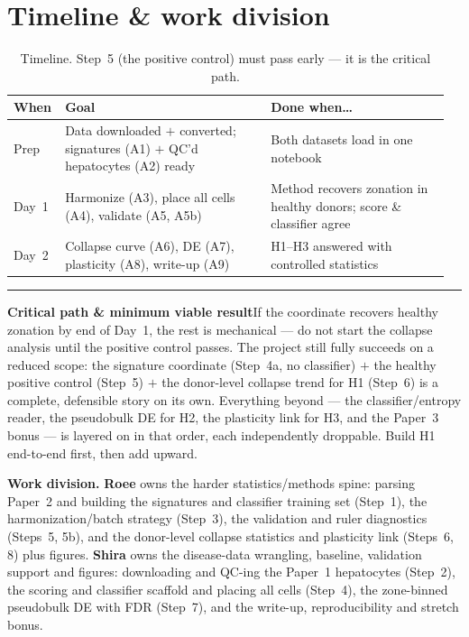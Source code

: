 \documentclass[11pt]{article}
\newcommand{\aside}[2]{\par\medskip\noindent\textcolor{teal0}{\rule{2pt}{\baselineskip}}\quad\textbf{\textcolor{teal0}{#1}}\quad #2\par\medskip}
\begin{document}
\clearpage
\section{Timeline \& work division}
\label{sec:timeline}

\begin{table}[h]
\centering\small
\caption{Timeline. Step~5 (the positive control) must pass early --- it is the critical path.}
\label{tab:timeline}
\begin{tabular}{@{}p{0.10\linewidth} p{0.46\linewidth} p{0.40\linewidth}@{}}
\toprule
\textbf{When} & \textbf{Goal} & \textbf{Done when\ldots}\\
\midrule
Prep & Data downloaded $+$ converted; signatures (A1) $+$ QC'd hepatocytes (A2) ready & Both datasets
load in one notebook\\
Day~1 & Harmonize (A3), place all cells (A4), validate (A5, A5b) & Method recovers zonation in healthy
donors; score \& classifier agree\\
Day~2 & Collapse curve (A6), DE (A7), plasticity (A8), write-up (A9) & H1--H3 answered with controlled
statistics\\
\bottomrule
\end{tabular}
\end{table}

\aside{Critical path \& minimum viable result}{If the coordinate recovers healthy zonation by end of
Day~1, the rest is mechanical --- do not start the collapse analysis until the positive control passes.
The project still fully succeeds on a reduced scope: the signature coordinate (Step~4a, no classifier)
$+$ the healthy positive control (Step~5) $+$ the donor-level collapse trend for H1 (Step~6) is a
complete, defensible story on its own. Everything beyond --- the classifier/entropy reader, the
pseudobulk DE for H2, the plasticity link for H3, and the Paper~3 bonus --- is layered on in that order,
each independently droppable. Build H1 end-to-end first, then add upward.}

\textbf{Work division.} \textbf{Roee} owns the harder statistics/methods spine: parsing Paper~2 and
building the signatures and classifier training set (Step~1), the harmonization/batch strategy (Step~3),
the validation and ruler diagnostics (Steps~5, 5b), and the donor-level collapse statistics and
plasticity link (Steps~6, 8) plus figures. \textbf{Shira} owns the disease-data wrangling, baseline,
validation support and figures: downloading and QC-ing the Paper~1 hepatocytes (Step~2), the scoring and
classifier scaffold and placing all cells (Step~4), the zone-binned pseudobulk DE with FDR (Step~7), and
the write-up, reproducibility and stretch bonus.
\end{document}
